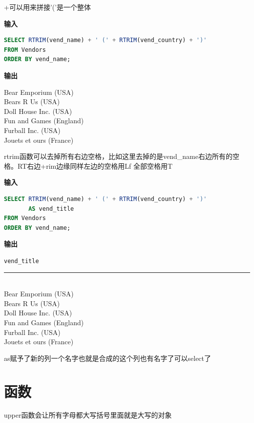 \begin{dxtips}
    +可以用来拼接'('是一个整体
\end{dxtips}
 \textbf{输入}
\begin{lstlisting}[language=SQL]
SELECT RTRIM(vend_name) + ' (' + RTRIM(vend_country) + ')'
FROM Vendors
ORDER BY vend_name;
\end{lstlisting}

\textbf{输出}
\begin{center}
    \begin{minipage}{0.8\textwidth}
        Bear Emporium (USA) \\
        Bears R Us (USA) \\
        Doll House Inc. (USA) \\
        Fun and Games (England) \\
        Furball Inc. (USA) \\
        Jouets et ours (France)
    \end{minipage}
\end{center}
\begin{dxtips}
    rtrim函数可以去掉所有右边空格，比如这里去掉的是vend_name右边所有的空格。RT右边+rim边缘同样左边的空格用Lf 全部空格用T
\end{dxtips}
\textbf{输入}
\begin{lstlisting}[language=SQL]
SELECT RTRIM(vend_name) + ' (' + RTRIM(vend_country) + ')'
       AS vend_title
FROM Vendors
ORDER BY vend_name;
\end{lstlisting}

\textbf{输出}
\begin{center}
    \begin{minipage}{0.8\textwidth}
        \texttt{vend\_title} \\
        \rule{\textwidth}{0.4pt} \\
        Bear Emporium (USA) \\
        Bears R Us (USA) \\
        Doll House Inc. (USA) \\
        Fun and Games (England) \\
        Furball Inc. (USA) \\
        Jouets et ours (France)
    \end{minipage}
\end{center}
\begin{dxtips}
    as赋予了新的列一个名字也就是合成的这个列也有名字了可以select了
\end{dxtips}
\section{函数}
\begin{dxtips}
    upper函数会让所有字母都大写括号里面就是大写的对象
\end{dxtips}


